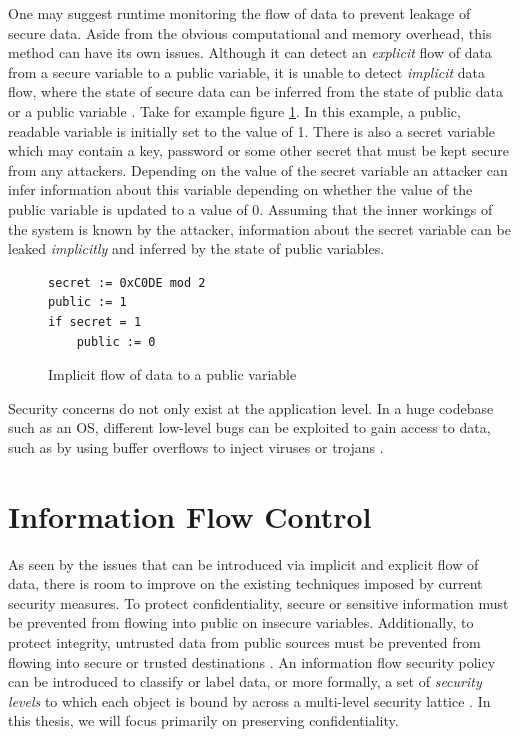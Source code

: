 \documentclass[twocolumn]{article}
\begin{document}
One may suggest runtime monitoring the flow of data to prevent leakage of secure data. Aside from the obvious computational and memory overhead, this method can have its own issues. Although it can detect an \textit{explicit} flow of data from a secure variable to a public variable, it is unable to detect \textit{implicit} data flow, where the state of secure data can be inferred from the state of public data or a public variable \cite{denning1977certification}. Take for example figure \ref{fig:implicit}. In this example, a public, readable variable is initially set to the value of 1. There is also a secret variable which may contain a key, password or some other secret that must be kept secure from any attackers. Depending on the value of the secret variable an attacker can infer information about this variable depending on whether the value of the public variable is updated to a value of 0. Assuming that the inner workings of the system is known by the attacker, information about the secret variable can be leaked \textit{implicitly} and inferred by the state of public variables.

\begin{figure}
    \begin{lstlisting}
secret := 0xC0DE mod 2
public := 1
if secret = 1
    public := 0
        \end{lstlisting}
    \caption{Implicit flow of data to a public variable}
    \label{fig:implicit}
\end{figure}

Security concerns do not only exist at the application level. In a huge codebase such as an OS, different low-level bugs can be exploited to gain access to data, such as by using buffer overflows to inject viruses or trojans \cite{agten2012recent}.

\section{Information Flow Control}
As seen by the issues that can be introduced via implicit and explicit flow of data, there is room to improve on the existing techniques imposed by current security measures. To protect confidentiality, secure or sensitive information must be prevented from flowing into public on insecure variables. Additionally, to protect integrity, untrusted data from public sources must be prevented from flowing into secure or trusted destinations \cite{balliu2014logics}. An information flow security policy can be introduced to classify or label data, or more formally, a set of \textit{security levels} to which each object is bound by across a multi-level security lattice \cite{denning1976lattice}. In this thesis, we will focus primarily on preserving confidentiality.
\end{document}
